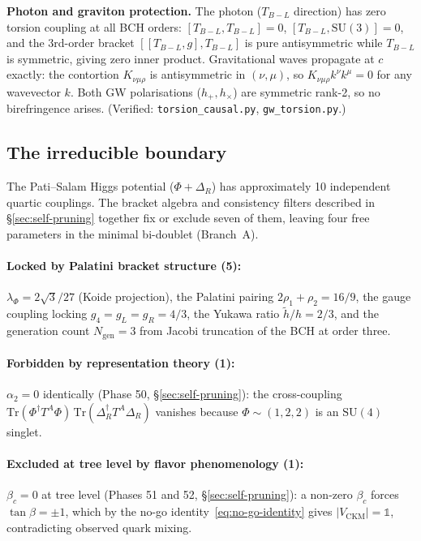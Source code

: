 \documentclass[11pt,a4paper]{article}
\theoremstyle{plain}
\theoremstyle{definition}
\theoremstyle{remark}
\begin{document}
\medskip
\noindent
\textbf{Photon and graviton protection.}
The photon ($T_{B{-}L}$ direction) has zero torsion coupling at
all BCH orders: $[T_{B{-}L}, T_{B{-}L}] = 0$,
$[T_{B{-}L}, \mathrm{SU}(3)] = 0$, and the 3rd-order bracket
$[[T_{B{-}L}, g], T_{B{-}L}]$ is pure antisymmetric while
$T_{B{-}L}$ is symmetric, giving zero inner product.
Gravitational waves propagate at $c$ exactly:
the contortion $K_{\nu\mu\rho}$ is antisymmetric in $(\nu,\mu)$,
so $K_{\nu\mu\rho} k^\nu k^\mu = 0$ for any wavevector $k$.
Both GW polarisations ($h_+, h_\times$) are symmetric rank-2,
so no birefringence arises.
(Verified: \texttt{torsion\_causal.py}, \texttt{gw\_torsion.py}.)

\subsection{The irreducible boundary}
\label{sec:boundary}

The Pati--Salam Higgs potential ($\Phi + \Delta_R$) has approximately
10 independent quartic couplings.  The bracket algebra and consistency
filters described in \S\ref{sec:self-pruning} together fix or exclude
seven of them, leaving four free parameters in the minimal bi-doublet
(Branch~A).

\paragraph{Locked by Palatini bracket structure (5):}
$\lambda_\Phi = 2\sqrt{3}/27$ (Koide projection),
the Palatini pairing $2\rho_1 + \rho_2 = 16/9$,
the gauge coupling locking $g_4 = g_L = g_R = 4/3$,
the Yukawa ratio $\tilde{h}/h = 2/3$,
and the generation count $N_{\mathrm{gen}} = 3$ from Jacobi
truncation of the BCH at order three.

\paragraph{Forbidden by representation theory (1):}
$\alpha_2 = 0$ identically (Phase 50, \S\ref{sec:self-pruning}):
the cross-coupling
$\mathrm{Tr}(\Phi^\dagger T^A \Phi)\,
 \mathrm{Tr}(\Delta_R^\dagger T^A \Delta_R)$ vanishes
because $\Phi \sim (1,2,2)$ is an $\mathrm{SU}(4)$ singlet.

\paragraph{Excluded at tree level by flavor phenomenology (1):}
$\beta_c = 0$ at tree level (Phases 51 and 52,
\S\ref{sec:self-pruning}): a non-zero $\beta_c$ forces
$\tan\beta = \pm 1$, which by the no-go
identity~\eqref{eq:no-go-identity} gives
$|V_{\mathrm{CKM}}| = \mathbb{1}$, contradicting observed quark mixing.
\end{document}
